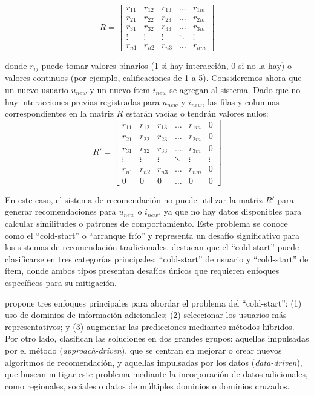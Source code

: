 		\begin{equation}
		R = \begin{bmatrix}
				r_{11} & r_{12} & r_{13} & \dots & r_{1m} \\
				r_{21} & r_{22} & r_{23} & \dots & r_{2m} \\
				r_{31} & r_{32} & r_{33} & \dots & r_{3m} \\
				\vdots & \vdots & \vdots & \ddots & \vdots \\
				r_{n1} & r_{n2} & r_{n3} & \dots & r_{nm}
				\end{bmatrix}
		\end{equation}

		donde $r_{ij}$ puede tomar valores binarios (1 si hay interacción, 0 si no la hay) o valores continuos (por ejemplo, calificaciones de 1 a 5). Consideremos ahora que un nuevo usuario $u_{new}$ y un nuevo ítem $i_{new}$ se agregan al sistema. Dado que no hay interacciones previas registradas para $u_{new}$ y $i_{new}$, las filas y columnas correspondientes en la matriz $R$ estarán vacías o tendrán valores nulos:
		\begin{equation}
		R' = \begin{bmatrix}
				r_{11} & r_{12} & r_{13} & \dots & r_{1m} & 0 \\
				r_{21} & r_{22} & r_{23} & \dots & r_{2m} & 0 \\
				r_{31} & r_{32} & r_{33} & \dots & r_{3m} & 0 \\
				\vdots & \vdots & \vdots & \ddots & \vdots & \vdots \\
				r_{n1} & r_{n2} & r_{n3} & \dots & r_{nm} & 0 \\
				0      & 0      & 0      & \dots & 0      & 0
				\end{bmatrix}
		\end{equation}

		En este caso, el sistema de recomendación no puede utilizar la matriz $R'$ para generar recomendaciones para $u_{new}$ o $i_{new}$, ya que no hay datos disponibles para calcular similitudes o patrones de comportamiento. Este problema se conoce como el \enquote{cold-start} o \enquote{arranque frío} y representa un desafío significativo para los sistemas de recomendación tradicionales. \cite{10339320} destacan que el \enquote{cold-start} puede clasificarse en tres categorías principales: \enquote{cold-start} de usuario y \enquote{cold-start} de ítem, donde ambos tipos presentan desafíos únicos que requieren enfoques específicos para su mitigación.

		\cite{SON201687} propone tres enfoques principales para abordar el problema del \enquote{cold-start}: (1) uso de dominios de información adicionales; (2) seleccionar los usuarios más representativos; y (3) augmentar las predicciones mediantes métodos híbridos. Por otro lado, \cite{10339320} clasifican las soluciones en dos grandes grupos: aquellas impulsadas por el método (\textit{approach-driven}), que se centran en mejorar o crear nuevos algoritmos de recomendación, y aquellas impulsadas por los datos (\textit{data-driven}), que buscan mitigar este problema mediante la incorporación de datos adicionales, como regionales, sociales o datos de múltiples dominios o dominios cruzados.

